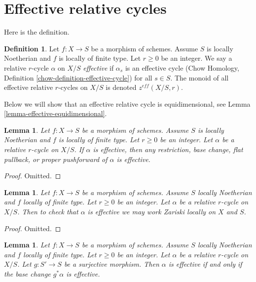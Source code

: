 \documentclass{stacks-project}
\theoremstyle{plain}
\newtheorem{lemma}[subsection]{Lemma}
\theoremstyle{definition}
\newtheorem{definition}[subsection]{Definition}
\theoremstyle{remark}
\numberwithin{equation}{subsection}
\begin{document}
\section{Effective relative cycles}
\label{section-effective}


\noindent
Here is the definition.

\begin{definition}
\label{definition-effective}
Let $f : X \to S$ be a morphism of schemes. Assume $S$ is locally Noetherian
and $f$ is locally of finite type. Let $r \geq 0$ be an integer. We say a
relative $r$-cycle $\alpha$ on $X/S$ {\it effective} if $\alpha_s$ is an
effective cycle
(Chow Homology, Definition \ref{chow-definition-effective-cycle})
for all $s \in S$. The monoid of all effective relative $r$-cycles
on $X/S$ is denoted $z^{eff}(X/S, r)$.
\end{definition}

\noindent
Below we will show that an effective relative cycle is equidimensional,
see Lemma \ref{lemma-effective-equidimensional}.

\begin{lemma}
\label{lemma-effective-functoriality}
Let $f : X \to S$ be a morphism of schemes. Assume $S$ is locally Noetherian
and $f$ is locally of finite type. Let $r \geq 0$ be an integer. Let
$\alpha$ be a relative $r$-cycle on $X/S$. If $\alpha$ is effective,
then any restriction, base change, flat pullback, or proper pushforward
of $\alpha$ is effective.
\end{lemma}

\begin{proof}
Omitted.
\end{proof}

\begin{lemma}
\label{lemma-check-effective}
Let $f : X \to S$ be a morphism of schemes. Assume $S$ locally Noetherian
and $f$ locally of finite type. Let $r \geq 0$ be an integer. Let $\alpha$
be a relative $r$-cycle on $X/S$. Then to check that $\alpha$ is effective
we may work Zariski locally on $X$ and $S$.
\end{lemma}

\begin{proof}
Omitted.
\end{proof}

\begin{lemma}
\label{lemma-effective-descent}
Let $f : X \to S$ be a morphism of schemes. Assume $S$ locally Noetherian
and $f$ locally of finite type. Let $r \geq 0$ be an integer. Let $\alpha$
be a relative $r$-cycle on $X/S$. Let $g : S' \to S$ be a surjective morphism.
Then $\alpha$ is effective if and only if the base change $g^*\alpha$
is effective.
\end{lemma}
\end{document}
